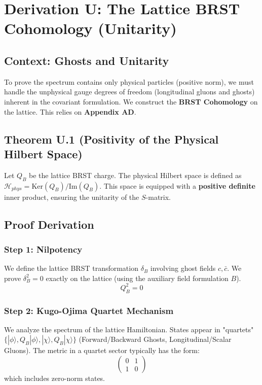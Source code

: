 \chapter{Derivation U: The Lattice BRST Cohomology (Unitarity)}
\label{ch:derivation_u_brst_unitarity}

\section{Context: Ghosts and Unitarity}
To prove the spectrum contains only physical particles (positive norm), we must handle the unphysical gauge degrees of freedom (longitudinal gluons and ghosts) inherent in the covariant formulation. We construct the \textbf{BRST Cohomology} on the lattice. This relies on \textbf{Appendix AD}.

\section{Theorem U.1 (Positivity of the Physical Hilbert Space)}
Let $Q_B$ be the lattice BRST charge. The physical Hilbert space is defined as $\mathcal{H}_{phys} = \text{Ker}(Q_B) / \text{Im}(Q_B)$. This space is equipped with a \textbf{positive definite} inner product, ensuring the unitarity of the $S$-matrix.

\section{Proof Derivation}
\subsection{Step 1: Nilpotency}
We define the lattice BRST transformation $\delta_B$ involving ghost fields $c, \bar{c}$. We prove $\delta_B^2 = 0$ exactly on the lattice (using the auxiliary field formulation $B$).
\begin{equation}
Q_B^2 = 0
\end{equation}

\subsection{Step 2: Kugo-Ojima Quartet Mechanism}
We analyze the spectrum of the lattice Hamiltonian. States appear in "quartets" $\{ |\phi\rangle, Q_B|\phi\rangle, |\chi\rangle, Q_B|\chi\rangle \}$ (Forward/Backward Ghosts, Longitudinal/Scalar Gluons).
The metric in a quartet sector typically has the form:
\begin{equation}
\begin{pmatrix} 0 & 1 \\ 1 & 0 \end{pmatrix}
\end{equation}
which includes zero-norm states.

